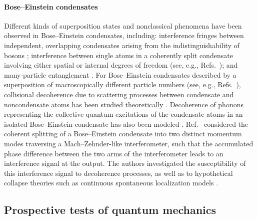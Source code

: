\documentclass[3p,sort&compress]{elsarticle}
\begin{document}
\paragraph{Bose--Einstein condensates} Different kinds of superposition states and nonclassical phenomena have been observed in Bose--Einstein condensates, including: interference fringes between independent, overlapping condensates arising from the indistinguishability of bosons \cite{Andrews:1997:um}; interference between single atoms in a coherently split condensate involving either spatial or internal degrees of freedom (see, e.g., Refs.~\cite{Shin:2004:lo,Gross:2010:gg}); and many-particle entanglement \cite{Tura:2014:oo,Schmied:2016:ll,Pezze:2018:uu}. For Bose--Einstein condensates described by a superposition of macroscopically different particle numbers (see, e.g., Refs.~\cite{Cirac:1998:mm,Ruostekoski:1998:mm,Gordon:1999:mh,Dunningham:2001:da,Calsamiglia:2001:tt,Louis:2001:mu,Micheli:2003:jn}), collisional decoherence  due to scattering processes between condensate and noncondensate atoms has been studied theoretically \cite{Dalvit:2000:bb}. Decoherence of phonons representing the collective quantum excitations of the condensate atoms in an isolated Bose--Einstein condensate has also been modeled \cite{Howl:2017:aa}. Ref.~\cite{Schrinski:2017:yy} considered the coherent splitting of a Bose--Einstein condensate into two distinct momentum modes traversing a Mach--Zehnder-like interferometer, such that the accumulated phase difference between the two arms of the interferometer leads to an interference signal at the output. The authors investigated the susceptibility of this interference signal to decoherence processes, as well as to hypothetical collapse theories such as continuous spontaneous localization models \cite{Bassi:2003:yb,Adler:2007:um,Bassi:2010:aa}.


\subsection{\label{sec:exper-tests-quant}Prospective tests of quantum mechanics}
\end{document}
